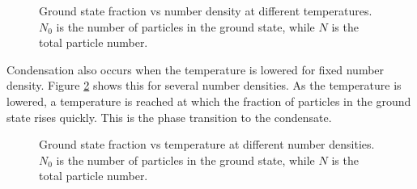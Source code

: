 \documentclass[pdftex]{article}    %
\begin{document}
\begin{figure}[htp]
\centering
{}
\caption{Ground state fraction vs number density at different temperatures.
  $N_0$ is the number of particles in the ground state, while $N$ is the
  total particle number.}
\label{fig:fix_T}
\end{figure}

Condensation also occurs when the temperature is lowered for fixed number
density.  Figure \ref{fig:fix_n} shows this for several number densities.
As the temperature is lowered, a temperature is reached at which the fraction
of particles in the ground state rises quickly.  This is the phase
transition to the condensate.

\begin{figure}[htp]
\centering
{}
\caption{Ground state fraction vs temperature at different number densities.
  $N_0$ is the number of particles in the ground state, while $N$ is the
  total particle number.}
\label{fig:fix_n}
\end{figure}
\end{document}
